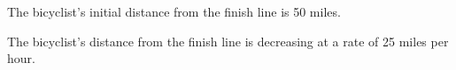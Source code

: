 \begin{solution}
    \begin{parts}
        \item The bicyclist's initial distance from the finish line is 50 miles.
        \item The bicyclist's distance from the finish line is decreasing at a rate of 25 miles per hour.
    \end{parts}
\end{solution}







